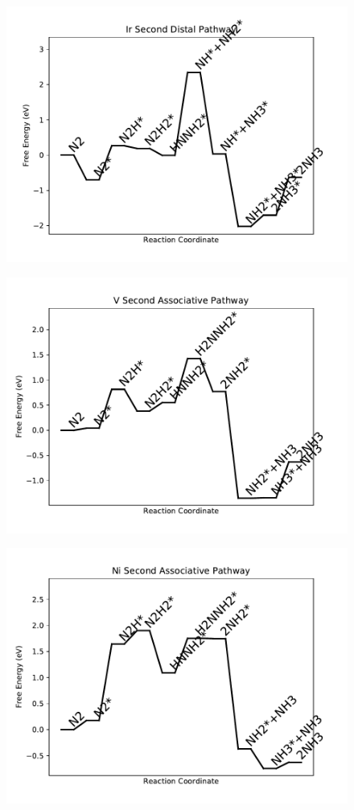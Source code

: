 \begin{figure}
\includegraphics[width=0.8\linewidth]{data/plots/Ir_distal_2.pdf}
\end{figure}

\begin{figure}
\includegraphics[width=0.8\linewidth]{data/plots/V_associative_2.pdf}
\end{figure}

\begin{figure}
\includegraphics[width=0.8\linewidth]{data/plots/Ni_associative_2.pdf}
\end{figure}

